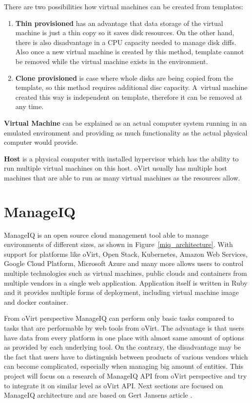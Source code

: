 \noindent There are two possibilities how virtual machines can be created from templates: 
\begin{enumerate}

\item \textbf{Thin provisioned} has an advantage that data storage of the virtual machine is just a thin copy so it saves disk resources. On the other hand, there is also disadvantage in a CPU capacity needed to manage disk diffs. Also once a new virtual machine is created by this method, template cannot be removed while the virtual machine exists in the environment. 

\item \textbf{Clone provisioned} is case where whole disks are being copied from the template, so this method requires additional disc capacity. A~virtual machine created this way is independent on template, therefore it can be removed at any time. 
\end{enumerate} 

\textbf{Virtual Machine} can be explained as an actual computer system running in an emulated environment and providing as much functionality as the actual physical computer would provide.

\textbf{Host} is a physical computer with installed hypervisor which has the ability to run multiple virtual machines on this host. oVirt usually has multiple host machines that are able to run as many virtual machines as the resources allow.

\chapter{ManageIQ}\label{MIQ}
ManageIQ is an open source cloud management tool able to manage environments of different sizes, as shown in Figure~\ref{miq_architecture}. With support for platforms like oVirt, Open Stack, Kubernetes, Amazon Web Services, Google Cloud Platform, Microsoft Azure and many more allows users to control multiple technologies such as virtual machines, public clouds and containers from multiple vendors in a single web application.
Application itself is written in Ruby and it provides multiple forms of deployment, including virtual machine image and docker container. 

From oVirt perspective ManageIQ can perform only basic tasks compared to tasks that are performable by web tools from oVirt. The advantage is that users have data from every platform in one place with almost same amount of options as provided by each underlying tool. On the contrary, the disadvantage may be the fact that users have to distinguish between products of various vendors which can become complicated, especially when managing big amount of entities. This project will focus on a research of ManageIQ API from oVirt perspective and try to integrate it on similar level as oVirt API.
Next sections are focused on ManageIQ architecture and are based on Gert Jansens article \cite{ManageIQarchitecture}.

